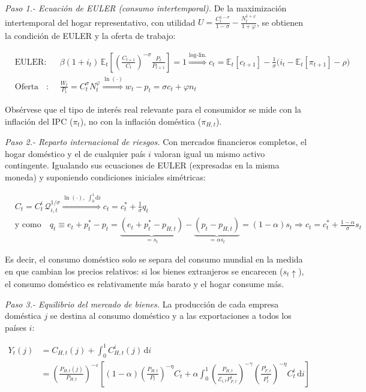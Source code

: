 \documentclass[10pt,a4paper]{article}
\begin{document}
\textit{Paso 1.- Ecuación de EULER (consumo intertemporal).} De la maximización intertemporal del hogar representativo, con utilidad $U=\frac{C_t^{1-\sigma}}{1-\sigma}-\frac{N_t^{1+\varphi}}{1+\varphi}$, se obtienen la condición de EULER y la oferta de trabajo:

$$\begin{aligned}
    &\text{EULER}:&&\beta(1+i_t)\,\mathbb E_t\left[\left(\frac{C_{t+1}}{C_t}\right)^{-\sigma}\frac{P_t}{P_{t+1}}\right]=1\overset{\text{log-lin.}}{\Longrightarrow}\boxed{c_t=\mathbb E_t[c_{t+1}]-\frac{1}{\sigma}\big(i_t-\mathbb E_t[\pi_{t+1}]-\rho\big)}\\[1em]
    &\text{Oferta de trabajo}:&&\frac{W_t}{P_t}=C_t^{\sigma}N_t^{\varphi}\overset{\ln(\cdot)}{\Longrightarrow}\boxed{w_t-p_t=\sigma c_t+\varphi n_t}
\end{aligned}$$

Obsérvese que el tipo de interés real relevante para el consumidor se mide con la inflación del IPC ($\pi_t$), no con la inflación doméstica ($\pi_{H,t}$).

\textit{Paso 2.- Reparto internacional de riesgos.} Con mercados financieros completos, el hogar doméstico y el de cualquier país $i$ valoran igual un mismo activo contingente. Igualando sus ecuaciones de EULER (expresadas en la misma moneda) y suponiendo condiciones iniciales simétricas:

$$\begin{aligned}
    &C_t=C_t^i\,\mathcal Q_{i,t}^{1/\sigma}\overset{\ln(\cdot),\;\int_0^1\mathrm di}{\Longrightarrow}c_t=c_t^*+\frac{1}{\sigma}q_t\\[1em]
    &\text{y como}\quad q_t\equiv e_t+p_t^*-p_t=\underbrace{(e_t+p_t^*-p_{H,t})}_{=s_t}-\underbrace{(p_t-p_{H,t})}_{=\alpha s_t}=(1-\alpha)s_t\Longrightarrow\boxed{c_t=c_t^*+\frac{1-\alpha}{\sigma}s_t}
\end{aligned}$$

Es decir, el consumo doméstico solo se separa del consumo mundial en la medida en que cambian los precios relativos: si los bienes extranjeros se encarecen ($s_t\uparrow$), el consumo doméstico es relativamente más barato y el hogar consume más.

\textit{Paso 3.- Equilibrio del mercado de bienes.} La producción de cada empresa doméstica $j$ se destina al consumo doméstico y a las exportaciones a todos los países $i$:

$$\begin{aligned}
    Y_t(j)&=C_{H,t}(j)+\int_0^1C_{H,t}^i(j)\,\mathrm di\\[0.5em]
    &=\left(\frac{P_{H,t}(j)}{P_{H,t}}\right)^{-\varepsilon}\left[(1-\alpha)\left(\frac{P_{H,t}}{P_t}\right)^{-\eta}C_t+\alpha\int_0^1\left(\frac{P_{H,t}}{\mathcal E_{i,t}P_{F,t}^i}\right)^{-\gamma}\left(\frac{P_{F,t}^i}{P_t^i}\right)^{-\eta}C_t^i\,\mathrm di\right]
\end{aligned}$$
\end{document}
